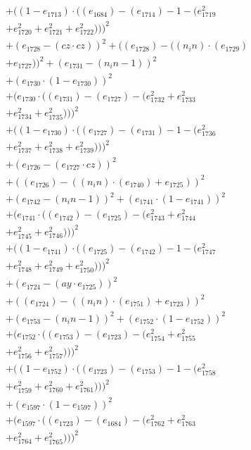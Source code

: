\documentclass[10pt, a4paper]{article}
\begin{document}
\begin{small}
\begin{align*}
& + ((1 - e_{1713})  \cdot  ((e_{1684}) - (e_{1714}) - 1 - (e_{1719}^{2} \\
& + e_{1720}^{2} + e_{1721}^{2} + e_{1722}^{2})))^{2} \\
& + (e_{1728} - (cz  \cdot  cz))^{2} + ((e_{1728}) - ((n_in)  \cdot  (e_{1729}) \\
& + e_{1727}))^{2} + (e_{1731} - (n_in - 1))^{2} \\
& + (e_{1730}  \cdot  (1 - e_{1730}))^{2} \\
& + (e_{1730}  \cdot  ((e_{1731}) - (e_{1727}) - (e_{1732}^{2} + e_{1733}^{2} \\
& + e_{1734}^{2} + e_{1735}^{2})))^{2} \\
& + ((1 - e_{1730})  \cdot  ((e_{1727}) - (e_{1731}) - 1 - (e_{1736}^{2} \\
& + e_{1737}^{2} + e_{1738}^{2} + e_{1739}^{2})))^{2} \\
& + (e_{1726} - (e_{1727}  \cdot  cz))^{2} \\
& + ((e_{1726}) - ((n_in)  \cdot  (e_{1740}) + e_{1725}))^{2} \\
& + (e_{1742} - (n_in - 1))^{2} + (e_{1741}  \cdot  (1 - e_{1741}))^{2} \\
& + (e_{1741}  \cdot  ((e_{1742}) - (e_{1725}) - (e_{1743}^{2} + e_{1744}^{2} \\
& + e_{1745}^{2} + e_{1746}^{2})))^{2} \\
& + ((1 - e_{1741})  \cdot  ((e_{1725}) - (e_{1742}) - 1 - (e_{1747}^{2} \\
& + e_{1748}^{2} + e_{1749}^{2} + e_{1750}^{2})))^{2} \\
& + (e_{1724} - (ay  \cdot  e_{1725}))^{2} \\
& + ((e_{1724}) - ((n_in)  \cdot  (e_{1751}) + e_{1723}))^{2} \\
& + (e_{1753} - (n_in - 1))^{2} + (e_{1752}  \cdot  (1 - e_{1752}))^{2} \\
& + (e_{1752}  \cdot  ((e_{1753}) - (e_{1723}) - (e_{1754}^{2} + e_{1755}^{2} \\
& + e_{1756}^{2} + e_{1757}^{2})))^{2} \\
& + ((1 - e_{1752})  \cdot  ((e_{1723}) - (e_{1753}) - 1 - (e_{1758}^{2} \\
& + e_{1759}^{2} + e_{1760}^{2} + e_{1761}^{2})))^{2} \\
& + (e_{1597}  \cdot  (1 - e_{1597}))^{2} \\
& + (e_{1597}  \cdot  ((e_{1723}) - (e_{1684}) - (e_{1762}^{2} + e_{1763}^{2} \\
& + e_{1764}^{2} + e_{1765}^{2})))^{2} \\

\end{align*}
\end{small}
\end{document}
